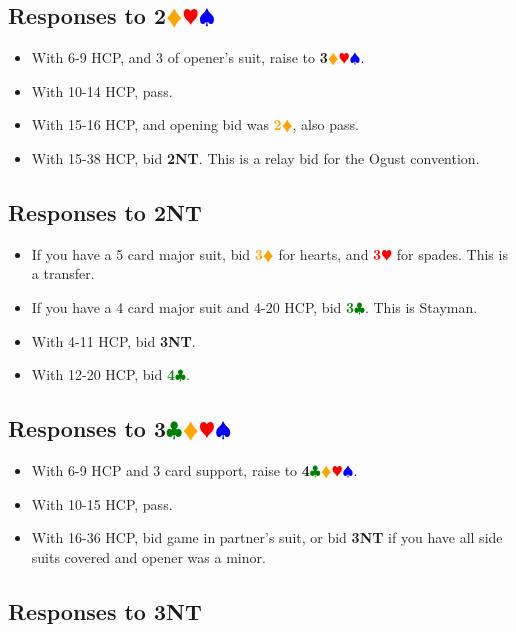 \documentclass{article}
\newcommand{\Hs}{\textcolor{Red}{$\varheart$}}
\newcommand{\Ss}{\textcolor{Blue}{$\spadesuit$}}
\newcommand{\Ds}{\textcolor{Orange}{$\vardiamond$}}
\newcommand{\Cs}{\textcolor{Green}{$\clubsuit$}}
\newcommand{\NTs}{\textbf{\footnotesize{NT}}}
\renewcommand{\H}[1]{\textcolor{Red}{\textbf{#1}\Hs}}
\newcommand{\D}[1]{\textcolor{Orange}{\textbf{#1}\Ds}}
\newcommand{\C}[1]{\textcolor{Green}{\textbf{#1}\Cs}}
\newcommand{\NT}[1]{\textbf{#1\NTs}}
\newcommand{\suits}[1]{\textbf{#1}\Cs\Ds\Hs\Ss}
\newcommand{\notclubs}[1]{\textbf{#1}\Ds\Hs\Ss}
\begin{document}
\subsection{Responses to \notclubs{2}}

\begin{itemize}
\item With 6-9 HCP, and 3 of opener's suit, raise to \notclubs{3}.
\item With 10-14 HCP, pass.
\item With 15-16 HCP, and opening bid was \D{2}, also pass.
\item With 15-38 HCP, bid \NT{2}. This is a relay bid for the Ogust convention.
\end{itemize}

\subsection{Responses to \NT{2}}

\begin{itemize}
\item If you have a 5 card major suit, bid \D{3} for hearts, and \H{3} for spades. This is a transfer.
\item If you have a 4 card major suit and 4-20 HCP, bid \C{3}. This is Stayman.
\item With 4-11 HCP, bid \NT{3}.
\item With 12-20 HCP, bid \C{4}.
\end{itemize}

\subsection{Responses to \suits{3}}

\begin{itemize}
\item With 6-9 HCP and 3 card support, raise to \suits{4}.
\item With 10-15 HCP, pass.
\item With 16-36 HCP, bid game in partner's suit, or bid \NT{3} if you have all side suits covered and opener was a minor.
\end{itemize}

\subsection{Responses to \NT{3}}
\end{document}
